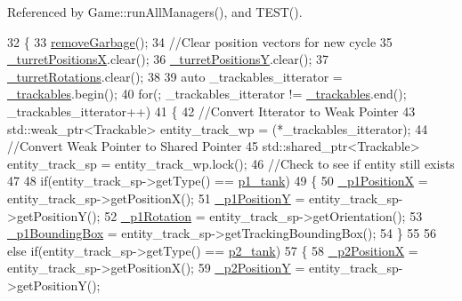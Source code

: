 Referenced by Game\-::run\-All\-Managers(), and T\-E\-S\-T().


\begin{DoxyCode}
32 \{
33     \hyperlink{classTrackingManager_a66f8f6f788618cb5aecfc1c228be2460}{removeGarbage}();
34     \textcolor{comment}{//Clear position vectors for new cycle}
35     \hyperlink{classTrackingManager_ad66641438bdcf33e772ef4ec1cdc7e14}{\_turretPositionsX}.clear();
36     \hyperlink{classTrackingManager_aaf2aa5d29aa7a7abd3a7e7f27bff7340}{\_turretPositionsY}.clear();
37     \hyperlink{classTrackingManager_adce9702d80c3554e7a359a145a6d2632}{\_turretRotations}.clear();
38 
39     \textcolor{keyword}{auto} \_trackables\_itterator = \hyperlink{classTrackingManager_add21c42cf5a993fbf5a95abd7e36f3dc}{\_trackables}.begin();
40     \textcolor{keywordflow}{for}(; \_trackables\_itterator != \hyperlink{classTrackingManager_add21c42cf5a993fbf5a95abd7e36f3dc}{\_trackables}.end(); \_trackables\_itterator++)
41     \{
42         \textcolor{comment}{//Convert Itterator to Weak Pointer}
43         std::weak\_ptr<Trackable> entity\_track\_wp = (*\_trackables\_itterator);
44         \textcolor{comment}{//Convert Weak Pointer to Shared Pointer}
45         std::shared\_ptr<Trackable> entity\_track\_sp = entity\_track\_wp.lock();
46         \textcolor{comment}{//Check to see if entity still exists}
47 
48             \textcolor{keywordflow}{if}(entity\_track\_sp->getType() == \hyperlink{Structures_8h_a6d8f83e710b27d4f86c45f0bb77066e3a31fa78b2b7dd774f5158a16ef230932e}{p1\_tank})
49             \{
50                 \hyperlink{classTrackingManager_a14b43a5e0cd605fff6b3308d0377f697}{\_p1PositionX} = entity\_track\_sp->getPositionX();
51                 \hyperlink{classTrackingManager_aa5b384a370b1ddccf76badc8a55459b1}{\_p1PositionY} = entity\_track\_sp->getPositionY();
52                 \hyperlink{classTrackingManager_a8c7de22662c27124fac80902d4f8ba41}{\_p1Rotation} = entity\_track\_sp->getOrientation();
53                 \hyperlink{classTrackingManager_a4916085aebb34a3921f3592d7ae07767}{\_p1BoundingBox} = entity\_track\_sp->getTrackingBoundingBox();
54             \}
55 
56             \textcolor{keywordflow}{else} \textcolor{keywordflow}{if}(entity\_track\_sp->getType() == \hyperlink{Structures_8h_a6d8f83e710b27d4f86c45f0bb77066e3a3d48d62c7b88e7ee171698fe56dc9e59}{p2\_tank})
57             \{
58                 \hyperlink{classTrackingManager_a0f3a043190aba11b137c52052dc2ed3a}{\_p2PositionX} = entity\_track\_sp->getPositionX();
59                 \hyperlink{classTrackingManager_ad4d803802447b6c8a1a09104263fd829}{\_p2PositionY} = entity\_track\_sp->getPositionY();

\end{DoxyCode}
